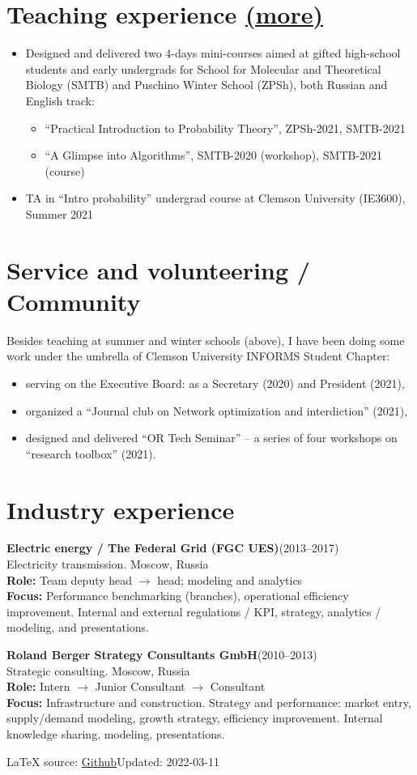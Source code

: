 \documentclass[11pt]{article} \usepackage{geometry} %
\newcommand{\jobl}[5]{%
  \textbf{#1}\hfill (#2)\\
  #3\vspace{0.25em}\\
  \textbf{Role:} #4\\
  \textbf{Focus:} #5}
\newcommand{\job}[5]{%
  \jobl{#1}{#2}{#3}{#4}{#5}\vspace{0.5em}
}
\newcommand{\mhref}[1]{\hfill\href{#1}{\small (more\faExternalLink*)}}
\begin{document}
   \section*{Teaching experience \mhref{https://www.bochkarev.io/teaching/}}
   \begin{itemize}
     \itemsep0pt
      \item Designed and delivered two 4-days mini-courses aimed at gifted
      high-school students and early undergrads for School for Molecular and
      Theoretical Biology (SMTB) and Puschino Winter School (ZPSh), both Russian
      and English track:
      \begin{itemize}
        \itemsep0pt
        \item ``Practical Introduction to Probability Theory'', ZPSh-2021,
          SMTB-2021
        \item ``A Glimpse into Algorithms'', SMTB-2020 (workshop), SMTB-2021 (course)
      \end{itemize}
      \item TA in ``Intro probability'' undergrad course at Clemson University
        (IE3600), Summer 2021
\end{itemize}
   \section*{Service and volunteering / Community}
   Besides teaching at summer and winter schools (above), I have been doing some work under the umbrella of Clemson University INFORMS Student Chapter:
   \begin{itemize}
     \itemsep0pt
   \item serving on the Executive Board: as a Secretary (2020) and President
     (2021),
   \item organized a ``Journal club on Network optimization and interdiction''
     (2021),
   \item designed and delivered ``OR Tech Seminar'' -- a series of four
     workshops on ``research toolbox'' (2021). 
   \end{itemize}
   \vspace{0.3em}

   \section*{Industry experience}
   \job{Electric energy / The Federal Grid (FGC UES)}{2013--2017}{Electricity transmission.
     Moscow, Russia}{Team deputy head $\rightarrow$ head; modeling and analytics}{Performance
     benchmarking (branches), operational efficiency improvement. Internal
     and external regulations / KPI, strategy, analytics / modeling, and presentations.}

   \noindent
   \job{Roland Berger Strategy Consultants GmbH}{2010--2013}{Strategic consulting.
     Moscow, Russia}{ Intern $\rightarrow$ Junior
     Consultant $\rightarrow$ Consultant}{Infrastructure and construction.
     Strategy and performance: market entry, supply/demand modeling, growth
     strategy, efficiency improvement. Internal knowledge sharing, modeling, presentations.}
   {%
   \vfill\noindent\tiny\LaTeX{} source: \href{https://github.com/alex-bochkarev/AB-CV}{Github}\hfill  Updated: 2022-03-11}
\end{document}
